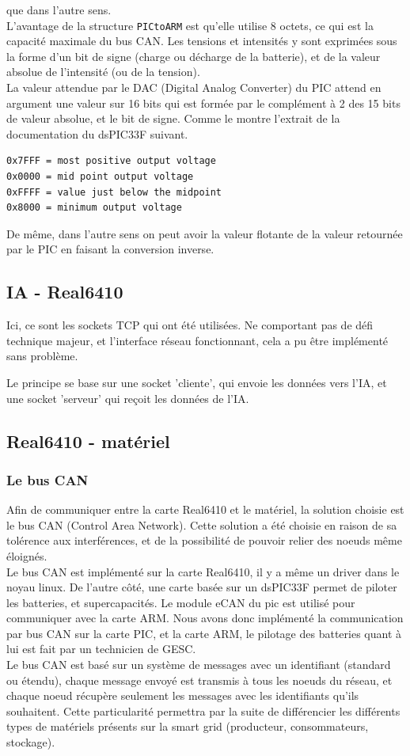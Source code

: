 \documentclass[a4,french,12pt]{article}
\begin{document}
que dans l'autre sens. \\
L'avantage de la structure \texttt{PICtoARM} est qu'elle utilise 8 octets, ce qui est la capacité maximale du bus CAN. 
Les tensions et intensités y sont exprimées sous la forme d'un bit de signe (charge ou décharge de la batterie), et de la 
valeur absolue de l'intensité (ou de la tension). \\
La valeur attendue par le DAC (Digital Analog Converter) du PIC attend en argument une valeur sur 16 bits qui est formée 
par le complément à 2 des 15 bits de valeur absolue, et le bit de signe. Comme le montre l'extrait de la documentation 
du dsPIC33F suivant.
\begin{verbatim}
0x7FFF = most positive output voltage
0x0000 = mid point output voltage
0xFFFF = value just below the midpoint
0x8000 = minimum output voltage
\end{verbatim}
De même, dans l'autre sens on peut avoir la valeur flotante de la valeur retournée par le PIC en faisant la conversion 
inverse.

\subsection{IA - Real6410}

Ici, ce sont les sockets TCP qui ont été utilisées. Ne comportant pas de défi technique majeur, et l'interface réseau fonctionnant, cela a pu être implémenté sans problème.

Le principe se base sur une socket 'cliente', qui envoie les données vers l'IA, et une socket 'serveur' qui reçoit les données de l'IA.




\subsection{Real6410 - matériel}
\subsubsection{Le bus CAN}
Afin de communiquer entre la carte Real6410 et le matériel, la solution choisie est le bus CAN (Control Area Network). Cette 
solution a été choisie en raison de sa tolérence aux interférences, et de la possibilité de pouvoir relier des noeuds même 
éloignés. \\
Le bus CAN est implémenté sur la carte Real6410, il y a même un driver dans le noyau linux. De l'autre côté, une carte 
basée sur un dsPIC33F permet de piloter les batteries, et supercapacités. Le module eCAN du pic est utilisé pour 
communiquer avec la carte ARM. Nous avons donc implémenté la communication par bus CAN sur la carte PIC, et la carte ARM, 
le pilotage des batteries quant à lui est fait par un technicien de GESC. \\
Le bus CAN est basé sur un système de messages avec un identifiant (standard ou étendu), chaque message envoyé est transmis 
à tous les noeuds du réseau, et chaque noeud récupère seulement les messages avec les identifiants qu'ils souhaitent. Cette 
particularité permettra par la suite de différencier les différents types de matériels présents sur la smart grid 
(producteur, consommateurs, stockage).
\end{document}
